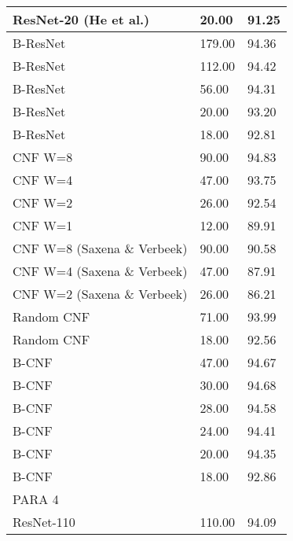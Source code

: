 \begin{table}[]
\begin{tabular}{|lll|}
ResNet-20 (He et al.)       & 20.00                       & 91.25       \\ \hline
B-ResNet                    & 179.00                      & 94.36       \\
B-ResNet                    & 112.00                      & 94.42       \\
B-ResNet                    & 56.00                       & 94.31       \\
B-ResNet                    & 20.00                       & 93.20       \\
B-ResNet                    & 18.00                       & 92.81       \\ \hline
CNF W=8                     & 90.00                       & 94.83       \\
CNF W=4                     & 47.00                       & 93.75       \\
CNF W=2                     & 26.00                       & 92.54       \\
CNF W=1                     & 12.00                       & 89.91       \\ \hline
CNF W=8 (Saxena \& Verbeek) & 90.00                       & 90.58       \\
CNF W=4 (Saxena \& Verbeek) & 47.00                       & 87.91       \\
CNF W=2 (Saxena \& Verbeek) & 26.00                       & 86.21       \\ \hline
Random CNF                  & 71.00                       & 93.99       \\
Random CNF                  & 18.00                       & 92.56       \\ \hline
B-CNF                       & 47.00                       & 94.67       \\
B-CNF                       & 30.00                       & 94.68       \\
B-CNF                       & 28.00                       & 94.58       \\
B-CNF                       & 24.00                       & 94.41       \\
B-CNF                       & 20.00                       & 94.35       \\
B-CNF                       & 18.00                       & 92.86       \\ \hline \hline
PARA 4                      &                             &             \\ \hline
ResNet-110                  & 110.00                      & 94.09       \\

\end{tabular}
\end{table}
